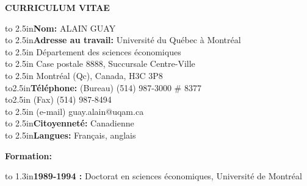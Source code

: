 



\setlength{\headheight}{0in}
\setlength{\headsep}{0in}
\setlength{\oddsidemargin}{0.35in}
\setlength{\topmargin}{0.25in}
\setlength{\textheight}{8.5in}
\setlength{\textwidth}{5.75in}






\centerline{\bf CURRICULUM VITAE}

\vspace{2 cm}

\noindent\hbox to 2.5in{\bf Nom:\hfill} ALAIN GUAY\\

\noindent\hbox to 2.5in{\bf Adresse au travail:\hfill} Universit\'e du Qu\'ebec \`a Montr\'eal\\
\noindent\hbox to 2.5in{\hfill} D\'epartement des sciences \'economiques\\
\noindent\hbox to 2.5in{\hfill} Case postale 8888, Succursale Centre-Ville\\
\noindent\hbox to 2.5in{\hfill} Montr\'eal (Qc), Canada, H3C 3P8\\

\noindent\hbox to2.5in{\bf T\'el\'ephone:\hfill} (Bureau) (514) 987-3000 \# 8377\\
\noindent\hbox to2.5in{\hfill} (Fax) (514) 987-8494\\
\noindent\hbox to 2.5in{\hfill} (e-mail) guay.alain@uqam.ca\\

\noindent\hbox to 2.5in{\bf Citoyennet\'e:\hfill} Canadienne\\

\noindent\hbox to 2.5in{\bf Langues:\hfill} Fran\c cais, anglais
\vspace{1 cm}

\centerline{\bf Formation:}
\vspace{.5 cm}

\noindent\hbox to 1.3in{\bf1989-1994 :\hfill} Doctorat en sciences \'economiques, Universit\'e de Montr\'eal

